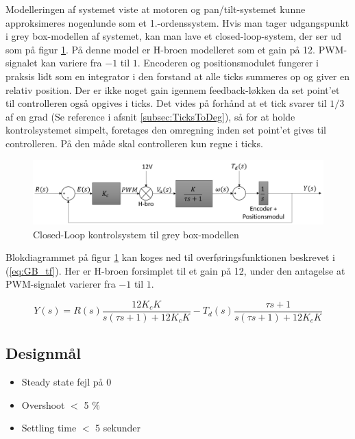 Modelleringen af systemet viste at motoren og pan/tilt-systemet kunne approksimeres nogenlunde som et 1.-ordenssystem.
Hvis man tager udgangspunkt i grey box-modellen af systemet, kan man lave et closed-loop-system, der ser ud som på figur \ref{fig:GB_Model}. På denne model er H-broen modelleret som et gain på 12. PWM-signalet kan variere fra $-1$ til $1$. Encoderen og positionsmodulet fungerer i praksis lidt som en integrator i den forstand at alle ticks summeres op og giver en relativ position. Der er ikke noget gain igennem feedback-løkken da set point'et til controlleren også opgives i ticks. Det vides på forhånd at et tick svarer til $1/3$ af en grad (Se reference i afsnit \ref{subsec:TicksToDeg}), så for at holde kontrolsystemet simpelt, foretages den omregning inden set point'et gives til controlleren. På den måde skal controlleren kun regne i ticks.

\begin{figure}[ht]
	\begin{center}
		\includegraphics[scale=0.5]{Billeder/Control_Loop.PNG}
	\end{center}
\caption{Closed-Loop kontrolsystem til grey box-modellen}
\label{fig:GB_Model}
\end{figure}

Blokdiagrammet på figur \ref{fig:GB_Model} kan koges ned til overføringsfunktionen beskrevet i (\ref{eq:GB_tf}). Her er H-broen forsimplet til et gain på 12, under den antagelse at PWM-signalet varierer fra $-1$ til $1$.

\begin{equation}\label{eq:GB_tf}
Y(s)=R(s)\frac{12K_{c}K}{s(\tau s+1)+12K_{c}K}-T_{d}(s)\frac{\tau s+1}{s(\tau s+1)+12K_{c}K}
\end{equation}

\subsection{Designmål}

\begin{itemize}

\item Steady state fejl på 0
\item Overshoot $<$ 5 $\%$
\item Settling time $<$ 5 sekunder

\end{itemize}

